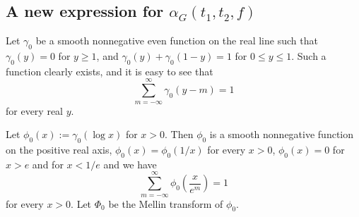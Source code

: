 \documentclass[12pt]{amsart}
\theoremstyle{definition}
\numberwithin{equation}{section}
\begin{document}
\subsection{A new expression for $\alpha_G\left(t_1,t_2,f\right)$}




Let $\gamma_0$ be a smooth nonnegative even function on the real line
such that $\gamma_0\left(y\right)=0$ for $y\ge 1$, and $\gamma_0\left
(y\right)+\gamma_0\left(1-y\right)=1$
for $0\le y\le 1$. Such a function clearly exists, and it is easy to see that
\[\sum_{m=-\infty}^{\infty}\gamma_0\left(y-m\right)=1\]
for every real $y$.

Let $\phi_0\left(x\right):=\gamma_0\left(\log x\right)$ for $x>0$. Then $
\phi_0$
is a smooth nonnegative function on the positive real axis,
$\phi_0\left(x\right)=\phi_0\left(1/x\right)$ for every $x>0$, $\phi_
0\left(x\right)=0$ for $x>e$ and
for $x<1/e$ and we have
\[\sum_{m=-\infty}^{\infty}\phi_0\left(\frac x{e^m}\right)=1\]
for every $x>0$. Let $\Phi_0$ be the Mellin transform of $\phi_0$.
\end{document}
